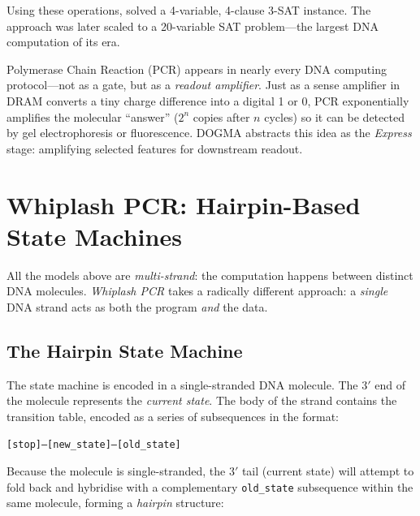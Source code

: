 Using these operations, \citet{liu2000surface} solved a 4-variable, 4-clause 3-SAT instance.  The approach was later scaled to a 20-variable SAT problem---the largest DNA computation of its era.

\begin{bioinsight}
Polymerase Chain Reaction (PCR) appears in nearly every DNA computing protocol---not as a gate, but as a \emph{readout amplifier}.  Just as a sense amplifier in DRAM converts a tiny charge difference into a digital 1 or 0, PCR exponentially amplifies the molecular ``answer'' ($2^n$ copies after $n$ cycles) so it can be detected by gel electrophoresis or fluorescence.  DOGMA abstracts this idea as the \emph{Express} stage: amplifying selected features for downstream readout.
\end{bioinsight}

\section{Whiplash PCR: Hairpin-Based State Machines}
\label{sec:whiplash-pcr}

All the models above are \emph{multi-strand}: the computation happens between distinct DNA molecules.  \emph{Whiplash PCR} \citep{sakamoto2000} takes a radically different approach: a \emph{single} DNA strand acts as both the program \emph{and} the data.

\subsection{The Hairpin State Machine}

The state machine is encoded in a single-stranded DNA molecule.  The 3$'$ end of the molecule represents the \emph{current state}.  The body of the strand contains the transition table, encoded as a series of subsequences in the format:

\begin{center}
\texttt{[stop]--[new\_state]--[old\_state]}
\end{center}

Because the molecule is single-stranded, the 3$'$ tail (current state) will attempt to fold back and hybridise with a complementary \texttt{old\_state} subsequence within the same molecule, forming a \emph{hairpin} structure:


